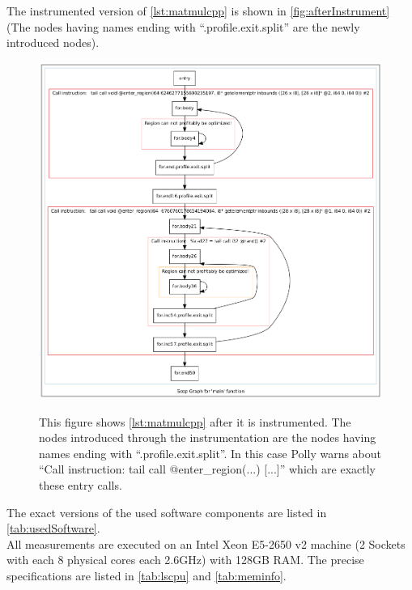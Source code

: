 \begin{sloppypar}
    The instrumented version of \autoref{lst:matmulcpp} is shown in \autoref{fig:afterInstrument} (The nodes having names ending with \enquote{.profile.exit.split} are the newly introduced nodes).
    \begin{figure}[!h]
        \caption[Example of instrumented method]{
            This figure shows \autoref{lst:matmulcpp} after it is instrumented.
            The nodes introduced through the instrumentation are the nodes having names ending with \enquote{.profile.exit.split}.
            In this case Polly warns about \enquote{Call instruction: tail call @enter\_region(...) [...]} which are exactly these entry calls.
        }
        \includegraphics[width=\textwidth]{gfx/matmulScopsAfterInstrumentation.png}
        \label{fig:afterInstrument}
    \end{figure}
    The exact versions of the used software components are listed in \autoref{tab:usedSoftware}.\\
    All measurements are executed on an Intel Xeon E5-2650 v2 machine (2 Sockets with each 8 physical cores each 2.6GHz) with 128GB RAM.
    The precise specifications are listed in \autoref{tab:lscpu} and \autoref{tab:meminfo}.
\end{sloppypar}
